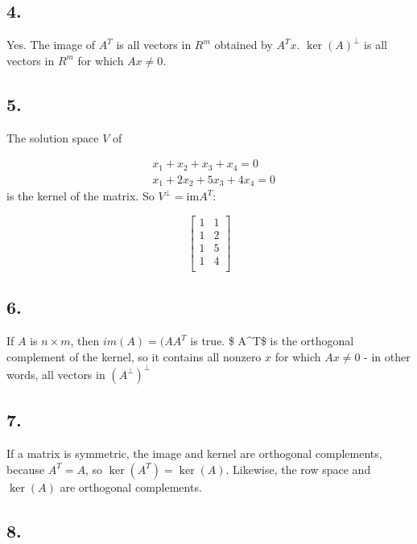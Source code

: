 \documentclass[]{article}
\begin{document}
\hypertarget{section-2}{%
\subsection{4.}\label{section-2}}

Yes. The image of \(A^T\) is all vectors in \(R^m\) obtained by
\(A^Tx\). \(\ker(A)^{\perp}\) is all vectors in \(R^m\) for which
\(Ax \neq 0\).

\hypertarget{section-3}{%
\subsection{5.}\label{section-3}}

The solution space \(V\) of

\[
  \begin{aligned}
    & x_1 + x_2 +x_3 +x_4 = 0\\
    & x_1 +2x_2 +5x_3 +4x_4 =0
  \end{aligned}
\] is the kernel of the matrix. So \(V^{\perp} = \text{im}A^T\):

\[ \begin{bmatrix}
  1 & 1\\
  1 & 2\\
  1 & 5\\
  1 & 4\\
\end{bmatrix}\]

\hypertarget{section-4}{%
\subsection{6.}\label{section-4}}

If \(A\) is \(n \times m\), then \(im(A) =(AA^T\) is true. \$
A\^{}T\$ is the orthogonal complement of the kernel, so it
contains all nonzero \(x\) for which \(Ax \neq 0\) - in other words, all
vectors in \((A^ {\perp})^{\perp}\)

\hypertarget{section-5}{%
\subsection{7.}\label{section-5}}

If a matrix is symmetric, the image and kernel are orthogonal
complements, because \(A^T=A\), so \(\ker(A^T) = \ker(A)\). Likewise,
the row space and \(\ker(A)\) are orthogonal complements.

\hypertarget{section-6}{%
\subsection{8.}\label{section-6}}
\end{document}
